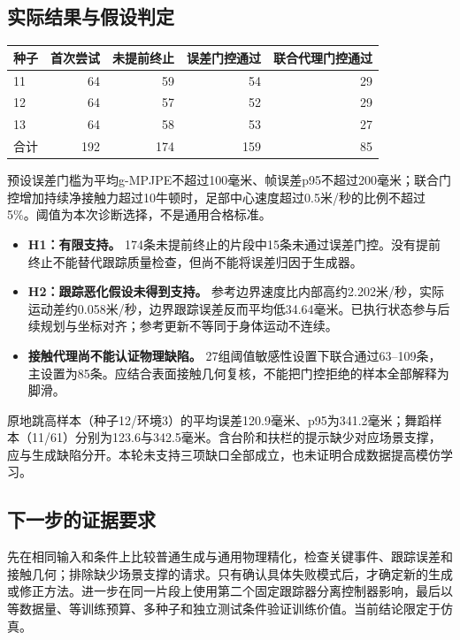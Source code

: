 \subsection{实际结果与假设判定}
\begin{center}\begin{tabular}{lrrrr}\hline
种子 & 首次尝试 & 未提前终止 & 误差门控通过 & 联合代理门控通过\\\hline
11 & 64 & 59 & 54 & 29\\
12 & 64 & 57 & 52 & 29\\
13 & 64 & 58 & 53 & 27\\
合计 & 192 & 174 & 159 & 85\\
\hline\end{tabular}\end{center}
预设误差门槛为平均g-MPJPE不超过100毫米、帧误差p95不超过200毫米；联合门控增加持续净接触力超过10牛顿时，足部中心速度超过0.5米/秒的比例不超过5\%。阈值为本次诊断选择，不是通用合格标准。
\begin{itemize}
\item \textbf{H1：有限支持。} 174条未提前终止的片段中15条未通过误差门控。没有提前终止不能替代跟踪质量检查，但尚不能将误差归因于生成器。
\item \textbf{H2：跟踪恶化假设未得到支持。} 参考边界速度比内部高约2.202米/秒，实际运动差约0.058米/秒，边界跟踪误差反而平均低34.64毫米。已执行状态参与后续规划与坐标对齐；参考更新不等同于身体运动不连续。
\item \textbf{接触代理尚不能认证物理缺陷。} 27组阈值敏感性设置下联合通过63--109条，主设置为85条。应结合表面接触几何复核，不能把门控拒绝的样本全部解释为脚滑。
\end{itemize}
原地跳高样本（种子12/环境3）的平均误差120.9毫米、p95为341.2毫米；舞蹈样本（11/61）分别为123.6与342.5毫米。含台阶和扶栏的提示缺少对应场景支撑，应与生成缺陷分开。本轮未支持三项缺口全部成立，也未证明合成数据提高模仿学习。
\subsection{下一步的证据要求}
先在相同输入和条件上比较普通生成与通用物理精化，检查关键事件、跟踪误差和接触几何；排除缺少场景支撑的请求。只有确认具体失败模式后，才确定新的生成或修正方法。进一步在同一片段上使用第二个固定跟踪器分离控制器影响，最后以等数据量、等训练预算、多种子和独立测试条件验证训练价值。当前结论限定于仿真。
